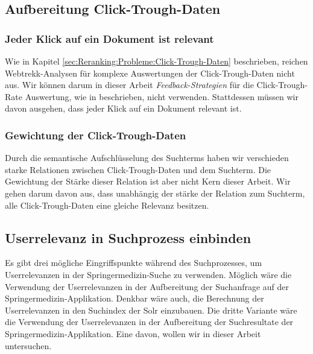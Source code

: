 \subsection{Aufbereitung Click-Trough-Daten}
\label{sec:Reranking:Methodik:Click-Trough-Daten}

\subsubsection{Jeder Klick auf ein Dokument ist relevant}
\label{sec:Reranking:Methodik:Click-Trough-Daten:Click-Trough-DatenAuswertungen}

Wie in Kapitel \ref{sec:Reranking:Probleme:Click-Trough-Daten} beschrieben, reichen Webtrekk-Analysen für komplexe Auswertungen der Click-Trough-Daten nicht aus. Wir können darum in dieser Arbeit \textit{Feedback-Strategien} für die Click-Trough-Rate Auswertung, wie in \cite{Joachims} beschrieben, nicht verwenden. Stattdessen müssen wir davon ausgehen, dass jeder Klick auf ein Dokument relevant ist.

\subsubsection{Gewichtung der Click-Trough-Daten}
\label{sec:Reranking:Methodik:Click-Trough-Daten:Gewichtung}

Durch die semantische Aufschlüsselung des Suchterms haben wir verschieden starke Relationen zwischen Click-Trough-Daten und dem Suchterm. Die Gewichtung der Stärke dieser Relation ist aber nicht Kern dieser Arbeit. Wir gehen darum davon aus, dass unabhängig der stärke der Relation zum Suchterm, alle Click-Trough-Daten eine gleiche Relevanz besitzen.

\subsection{Userrelevanz in Suchprozess einbinden}
\label{sec:Reranking:Methodik:SucheEinbinden}

Es gibt drei mögliche Eingriffspunkte während des Suchprozesses, um Userrelevanzen in der Springermedizin-Suche zu verwenden. Möglich wäre die Verwendung der Userrelevanzen in der Aufbereitung der Suchanfrage auf der Springermedizin-Applikation. Denkbar wäre auch, die Berechnung der Userrelevanzen in den Suchindex der Solr einzubauen. Die dritte Variante wäre die Verwendung der Userrelevanzen in der Aufbereitung der Suchresultate der Springermedizin-Applikation. Eine davon, wollen wir in dieser Arbeit untersuchen. 

